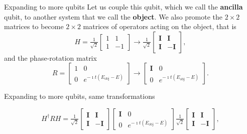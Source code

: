 \documentclass{beamer}
\begin{document}
\begin{frame}{Expanding to more qubits}
Let us couple this qubit, which we call the {\bf ancilla} qubit, to another
system that we call the {\bf object}. We also promote the $2\times 2$ matrices to
become $2\times 2$ matrices of operators acting on the object, that is 
\[
H=\tfrac{1}{\sqrt{2}}\begin{bmatrix} 1 & 1 \\ 1 & -1\end{bmatrix}\rightarrow\tfrac{1}{\sqrt{2}}\begin{bmatrix} \bm{I} & \bm{I} \\ \bm{I} & -\bm{I}\end{bmatrix},
\]
and the phase-rotation matrix
\[
R=\begin{bmatrix} 1 & 0 \\ 0 & e^{-\imath t(E_{\mathrm{obj}}-E)}\end{bmatrix}\rightarrow \begin{bmatrix} \bm{I} & 0 \\ 0 & e^{-\imath t(E_{\mathrm{obj}}-E)}\end{bmatrix}.
\]


\end{frame}

\begin{frame}{Expanding to more qubits, same transformations}

\[
H^{\dagger}RH=\tfrac{1}{\sqrt{2}}\begin{bmatrix} \bm{I} & \bm{I} \\ \bm{I} & -\bm{I}\end{bmatrix} \begin{bmatrix} \bm{I} & 0 \\ 0 & e^{-\imath t(E_{\mathrm{obj}}-E)}\end{bmatrix} \tfrac{1}{\sqrt{2}}\begin{bmatrix} \bm{I} & \bm{I} \\ \bm{I} & -\bm{I}\end{bmatrix},
\]


\end{frame}
\end{document}
